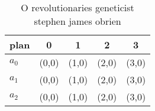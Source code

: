 \documentclass[a4paper]{article}
\begin{document}
\begin{table}
\begin{adjustbox}{width=0.6\columnwidth}
\begin{tabular}{|l|l|l|l|l|}
\hline
\textbf{plan} & \multicolumn{1}{c|}{\textbf{0}} & \multicolumn{1}{c|}{\textbf{1}} & \multicolumn{1}{c|}{\textbf{2}} & \multicolumn{1}{c|}{\textbf{3}} \\ \hline
\textbf{$a_0$}  & (0,0) & (1,0) & (2,0) & (3,0) \\ \hline
\textbf{$a_1$}  & (0,0) & (1,0) & (2,0) & (3,0) \\ \hline
\textbf{$a_2$}  & (0,0) & (1,0) & (2,0) & (3,0) \\ \hline
\end{tabular}
\end{adjustbox}
\caption{O revolutionaries geneticist stephen james obrien
}
\end{table}
\end{document}
